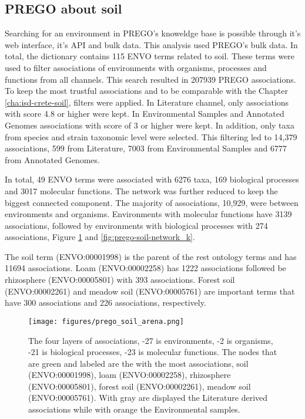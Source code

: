    \subsection{PREGO about soil}
   \label{subsec:prego-soil}

Searching for an environment in PREGO's knoweldge base is possible through
it's web interface, it's API and bulk data. This analysis used PREGO's bulk data. 
In total, the dictionary contains 115 ENVO terms related to soil. These terms were
used to filter associations of environments with organisms, processes and functions 
from all channels. This search resulted in 207939 PREGO associations. 
To keep the most trustful associations and to be comparable with the Chapter \ref{cha:isd-crete-soil},
filters were applied. In Literature channel, only associations with score 4.8 or higher were kept. 
In Environmental Samples and Annotated Genomes associations with score of 3 or higher were kept. 
In addition, only taxa from species and strain taxonomic level were selected.
This filtering led to 14,379 associations, 599 from Literature, 7003 from Environmental
Samples and 6777 from Annotated Genomes.

In total, 49 ENVO terms were associated with 6276 taxa, 169 biological processes
and 3017 molecular functions. The network was further reduced to keep the 
biggest connected component. 
The majority of associations, 10,929, were between environments and organisms.
Environments with molecular functions have 3139 associations, followed by 
environments with biological processes with 274 associations, Figure \ref{fig:prego-soil-network} and \ref{fig:prego-soil-network_k}.

The soil term (ENVO:00001998) is the parent of the rest ontology terms and has 11694 associations.
Loam (ENVO:00002258) has 1222 associations followed be
rhizosphere (ENVO:00005801) with 393 associations.
Forest soil (ENVO:00002261) and meadow soil (ENVO:00005761) are important terms
that have 300 associations and 226 associations, respectively.

   \begin{figure}[hbt!]
      \centering
      \texttt{[image: figures/prego\_soil\_arena.png]}
      \caption[PREGO soil network of literature and environmental samples]{
         The four layers of associations, -27 is environments, -2 is organisms, -21 is biological processes, -23 is molecular functions.
     The nodes that are green and labeled are the with the most associations,
     soil (ENVO:00001998), loam (ENVO:00002258), rhizosphere (ENVO:00005801), forest soil (ENVO:00002261), meadow soil (ENVO:00005761). 
 With gray are displayed the Literature derived associations while with orange the Environmental samples. }
      \label{fig:prego-soil-network}
   \end{figure}
   


